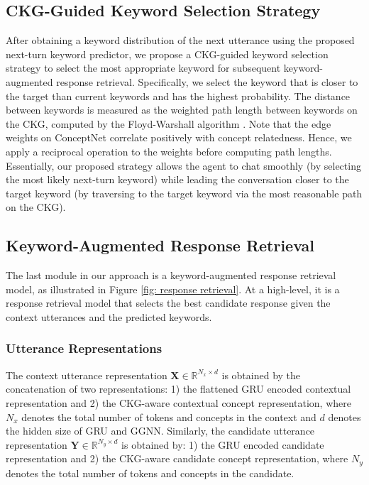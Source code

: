 \documentclass[letterpaper]{article} %
\begin{document}
\subsection{CKG-Guided Keyword Selection Strategy}
After obtaining a keyword distribution of the next utterance using the proposed next-turn keyword predictor, we propose a CKG-guided keyword selection strategy to select the most appropriate keyword for subsequent keyword-augmented response retrieval. Specifically, we select the keyword that is closer to the target than current keywords and has the highest probability. The distance between keywords is measured as the weighted path length between keywords on the CKG, computed by the Floyd-Warshall algorithm \cite{floyd1962algorithm}. Note that the edge weights on ConceptNet correlate positively with concept relatedness. Hence, we apply a reciprocal operation to the weights before computing path lengths. Essentially, our proposed strategy allows the agent to chat smoothly (by selecting the most likely next-turn keyword) while leading the conversation closer to the target keyword (by traversing to the target keyword via the most reasonable path on the CKG).

\subsection{Keyword-Augmented Response Retrieval}
The last module in our approach is a keyword-augmented response retrieval model, as illustrated in Figure \ref{fig: response retrieval}. At a high-level, it is a response retrieval model that selects the best candidate response given the context utterances and the predicted keywords.

\subsubsection{Utterance Representations}
The context utterance representation $\mathbf{X} \in \mathbb{R}^{N_x \times d}$ is obtained by the concatenation of two representations: 1) the flattened GRU encoded contextual representation and 2) the CKG-aware contextual concept representation, where $N_x$ denotes the total number of tokens and concepts in the context and $d$ denotes the hidden size of GRU and GGNN. Similarly, the candidate utterance representation $\mathbf{Y} \in \mathbb{R}^{N_y \times d}$ is obtained by: 1) the GRU encoded candidate representation and 2) the CKG-aware candidate concept representation, where $N_y$ denotes the total number of tokens and concepts in the candidate.
\end{document}
